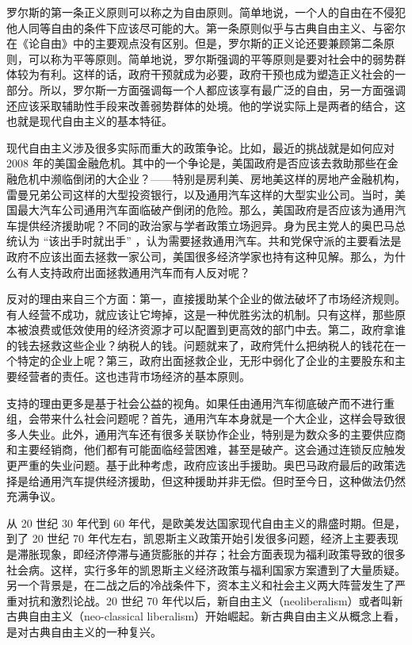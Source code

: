 罗尔斯的第一条正义原则可以称之为自由原则。简单地说，一个人的自由在不侵犯他人同等自由的条件下应该尽可能的大。第一条原则似乎与古典自由主义、与密尔在《论自由》中的主要观点没有区别。但是，罗尔斯的正义论还要兼顾第二条原则，可以称为平等原则。简单地说，罗尔斯强调的平等原则是要对社会中的弱势群体较为有利。这样的话，政府干预就成为必要，政府干预也成为塑造正义社会的一部分。所以，罗尔斯一方面强调每一个人都应该享有最广泛的自由，另一方面强调还应该采取辅助性手段来改善弱势群体的处境。他的学说实际上是两者的结合，这也就是现代自由主义的基本特征。

现代自由主义涉及很多实际而重大的政策争论。比如，最近的挑战就是如何应对 2008 年的美国金融危机。其中的一个争论是，美国政府是否应该去救助那些在金融危机中濒临倒闭的大企业？——特别是房利美、房地美这样的房地产金融机构，雷曼兄弟公司这样的大型投资银行，以及通用汽车这样的大型实业公司。当时，美国最大汽车公司通用汽车面临破产倒闭的危险。那么，美国政府是否应该为通用汽车提供经济援助呢？不同的政治家与学者政策立场迥异。身为民主党人的奥巴马总统认为 “该出手时就出手” ，认为需要拯救通用汽车。共和党保守派的主要看法是政府不应该出面去拯救一家公司，美国很多经济学家也持有这种见解。那么，为什么有人支持政府出面拯救通用汽车而有人反对呢？

反对的理由来自三个方面：第一，直接援助某个企业的做法破坏了市场经济规则。有人经营不成功，就应该让它垮掉，这是一种优胜劣汰的机制。只有这样，那些原本被浪费或低效使用的经济资源才可以配置到更高效的部门中去。第二，政府拿谁的钱去拯救这些企业？纳税人的钱。问题就来了，政府凭什么把纳税人的钱花在一个特定的企业上呢？第三，政府出面拯救企业，无形中弱化了企业的主要股东和主要经营者的责任。这也违背市场经济的基本原则。

支持的理由更多是基于社会公益的视角。如果任由通用汽车彻底破产而不进行重组，会带来什么社会问题呢？首先，通用汽车本身就是一个大企业，这样会导致很多人失业。此外，通用汽车还有很多关联协作企业，特别是为数众多的主要供应商和主要经销商，他们都有可能面临经营困难，甚至是破产。这会通过连锁反应触发更严重的失业问题。基于此种考虑，政府应该出手援助。奥巴马政府最后的政策选择是给通用汽车提供经济援助，但这种援助并非无偿。但时至今日，这种做法仍然充满争议。


从 20 世纪 30 年代到 60 年代，是欧美发达国家现代自由主义的鼎盛时期。但是，到了 20 世纪 70 年代左右，凯恩斯主义政策开始引发很多问题，经济上主要表现是滞胀现象，即经济停滞与通货膨胀的并存；社会方面表现为福利政策导致的很多社会病。这样，实行多年的凯恩斯主义经济政策与福利国家方案遭到了大量质疑。另一个背景是，在二战之后的冷战条件下，资本主义和社会主义两大阵营发生了严重对抗和激烈论战。20 世纪 70 年代以后，新自由主义（neoliberalism）或者叫新古典自由主义（neo-classical liberalism）开始崛起。新古典自由主义从概念上看，是对古典自由主义的一种复兴。

